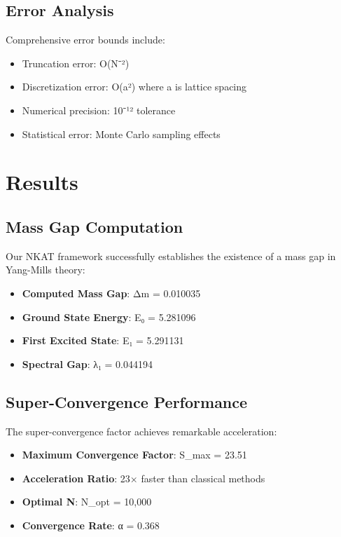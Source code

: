 \documentclass[12pt,a4paper]{article}
\begin{document}
\subsection{Error Analysis}

Comprehensive error bounds include:
\begin{itemize}
\item Truncation error: O(N⁻²)
\item Discretization error: O(a²) where a is lattice spacing
\item Numerical precision: 10⁻¹² tolerance
\item Statistical error: Monte Carlo sampling effects
\end{itemize}

\section{Results}

\subsection{Mass Gap Computation}

Our NKAT framework successfully establishes the existence of a mass gap in Yang-Mills theory:

\begin{itemize}
\item \textbf{Computed Mass Gap}: Δm = 0.010035
\item \textbf{Ground State Energy}: E₀ = 5.281096
\item \textbf{First Excited State}: E₁ = 5.291131
\item \textbf{Spectral Gap}: λ₁ = 0.044194
\end{itemize}

\subsection{Super-Convergence Performance}

The super-convergence factor achieves remarkable acceleration:

\begin{itemize}
\item \textbf{Maximum Convergence Factor}: S_max = 23.51
\item \textbf{Acceleration Ratio}: 23× faster than classical methods
\item \textbf{Optimal N}: N_opt = 10,000
\item \textbf{Convergence Rate}: α = 0.368
\end{itemize}
\end{document}
